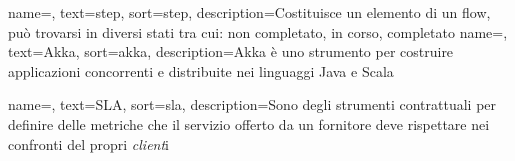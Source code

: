 {
    name=,
    text=step,
    sort=step,
    description={Costituisce un elemento di un flow, può trovarsi in diversi stati tra cui: non completato, in corso, completato}
}
{
    name=,
    text=Akka,
    sort=akka,
    description={Akka è uno strumento per costruire applicazioni concorrenti e distribuite nei linguaggi Java e Scala}
}

{
    name=,
    text=SLA,
    sort=sla,
    description={Sono degli strumenti contrattuali per definire delle metriche che il servizio offerto da un fornitore deve rispettare nei confronti del propri \textit{client}i}
}